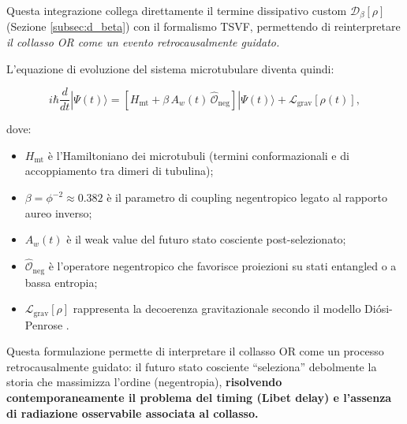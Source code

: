 \documentclass[11pt,a4paper]{article}
\let\oldcite\cite
\renewcommand{\cite}{\protect\oldcite}
\let\oldref\ref
\renewcommand{\ref}{\protect\oldref}
\theoremstyle{plain}
\theoremstyle{definition}
\begin{document}
\vspace{0.3cm}


Questa integrazione collega direttamente il termine dissipativo custom $\mathcal{D}_\beta[\rho]$ (Sezione \ref{subsec:d_beta}) con il formalismo TSVF, permettendo di reinterpretare \emph{il collasso OR come un evento retrocausalmente guidato.}


\vspace{0.3cm}

L’equazione di evoluzione del sistema microtubulare diventa quindi:


\vspace{0.2cm}

\begin{tcolorbox}[colback=blue!3!white, colframe=blue!80!black, 
                  title={\textbf{Equazione di evoluzione Orch-OR estesa con weak values}}, 
                  sharp corners, boxrule=0.9pt, coltitle=white]
\begin{equation}
i\hbar \frac{d}{dt} |\Psi(t)\rangle = \left[ H_{\text{mt}} + \beta \, A_w(t) \, \hat{\mathcal{O}}_{\text{neg}} \right] |\Psi(t)\rangle + \mathcal{L}_{\text{grav}}[\rho(t)],
\label{eq:orch_or_weak}
\end{equation}
\end{tcolorbox}


\vspace{0.2cm}

dove:
\begin{itemize}
    \item $H_{\text{mt}}$ è l’Hamiltoniano dei microtubuli (termini conformazionali e di accoppiamento tra dimeri di tubulina);
    \item $\beta = \phi^{-2} \approx 0.382$ è il parametro di coupling negentropico legato al rapporto aureo inverso;
    \item $A_w(t)$ è il weak value del futuro stato cosciente post-selezionato;
    \item $\hat{\mathcal{O}}_{\text{neg}}$ è l’operatore negentropico che favorisce proiezioni su stati entangled o a bassa entropia;
    \item $\mathcal{L}_{\text{grav}}[\rho]$ rappresenta la decoerenza gravitazionale secondo il modello Diósi-Penrose \cite{diosi_penrose_2014}.
\end{itemize}


\vspace{0.5cm}

Questa formulazione permette di interpretare il collasso OR come un processo retrocausalmente guidato: il futuro stato cosciente “seleziona” debolmente la storia che massimizza l’ordine (negentropia), \textbf{risolvendo contemporaneamente il problema del timing (Libet delay) e l’assenza di radiazione osservabile associata al collasso.} 
\end{document}

